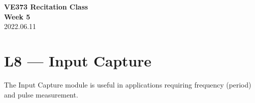 \documentclass[a4paper]{article}
\begin{document}
\renewcommand{\thesection}{\Roman{section}}
\renewcommand{\thesubsection}{\Alph{subsection}}
\renewcommand{\thesubsubsection}{\thesubsection.\arabic{subsubsection}}
\renewcommand{\d}{\: \mathrm{d}}
\newcommand{\e}{\mathrm{e}}

\begin{center}
	\textbf{\Large VE373 Recitation Class}\\[1em]
	\textbf{\large Week 5} \\[1em]
	2022.06.11 \\[1em]
\end{center}

\section{L8 --- Input Capture}
	\par The Input Capture module is useful in applications requiring frequency (period) and pulse measurement.
\end{document}
